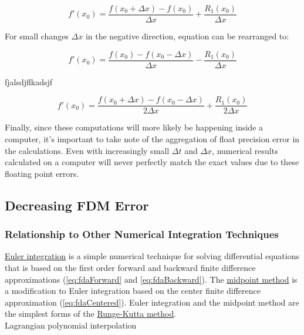 { \begin{equation}
 f'(x_{0}) = \frac{f(x_{0} + \Delta  x) - f(x_{0})}{\Delta  x} + \frac{R_{1}(x_{0})}{\Delta  x}
  \end{equation}
  
For small changes $\Delta  x$ in the negative direction, equation  can be rearranged to:

 \begin{equation}
 f'(x_{0}) = \frac{f(x_{0}) - f(x_{0} - \Delta  x)}{\Delta  x} - \frac{R_{1}(x_{0})}{\Delta  x}
  \end{equation}
  
  fjalsdjflkadsjf
  
   \begin{equation}
 f'(x_{0}) = \frac{f(x_{0} + \Delta  x) - f(x_{0} - \Delta  x)}{2\Delta x} + \frac{R_{1}(x_{0})}{2\Delta  x}
  \end{equation}
  
  Finally, since these computations will more likely be happening inside a computer, it's important to take note of the aggregation of float precision error in the calculations.  Even with increasingly small $\Delta t$ and $\Delta x$, numerical results calculated on a computer will never perfectly match the exact values due to these floating point errors.
  
  \subsection{Decreasing FDM Error}
  
  \subsubsection{Relationship to Other Numerical Integration Techniques}
  
  \href{https://en.wikipedia.org/wiki/Euler_method}{Euler integration} is a simple numerical technique for solving differential equations that is based on the first order forward and backward finite difference approximations (\ref{eq:fdaForward} and \ref{eq:fdaBackward}).  The \href{https://en.wikipedia.org/wiki/Midpoint_method}{midpoint method} is a modification to Euler integration based on the center finite difference approximation (\ref{eq:fdaCentered}).  Euler integration and the midpoint method are the simplest forms of the \href{https://en.wikipedia.org/wiki/Runge%E2%80%93Kutta_methods}{Runge-Kutta method}.\\

Lagrangian polynomial interpolation
    
}
